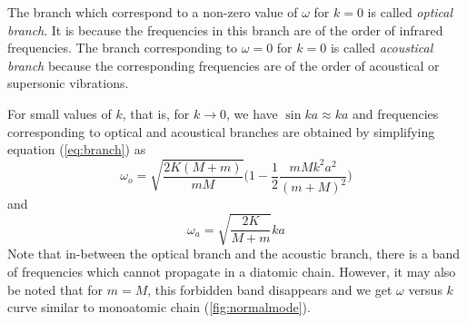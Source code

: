 \documentclass[%
 aip,
 amsmath,amssymb,
 reprint, floatfix%
]{revtex4-1}
\begin{document}
    \par
    The branch which correspond to a non-zero value of $\omega$ for $k=0$ is called \textit{optical branch}. It is because the frequencies in this branch are of the order of infrared frequencies. The branch corresponding to $\omega=0$ for $k=0$ is called \textit{acoustical branch} because the corresponding frequencies are of the order of acoustical or supersonic vibrations.
    \par
    For small values of $k$, that is, for $k \rightarrow 0$, we have $\sin ka \approx ka$ and frequencies corresponding to optical and acoustical branches are obtained by simplifying equation (\ref{eq:branch}) as
    \begin{equation}
        \omega_o = \sqrt{\dfrac{2K(M+m)}{mM}} \Bigg( 1 - \dfrac{1}{2} \dfrac{mMk^2a^2}{(m+M)^2} \Bigg)
    \end{equation}
    and
    \begin{equation}
        \omega_a = \sqrt{\dfrac{2K}{M+m}} ka
    \end{equation}
    Note that in-between the optical branch and the acoustic branch, there is a band of frequencies which cannot propagate in a diatomic chain. However, it may also be noted that for $m=M$, this forbidden band disappears and we get $\omega$ versus $k$ curve similar to monoatomic chain (\ref{fig:normalmode}).
\end{document}
